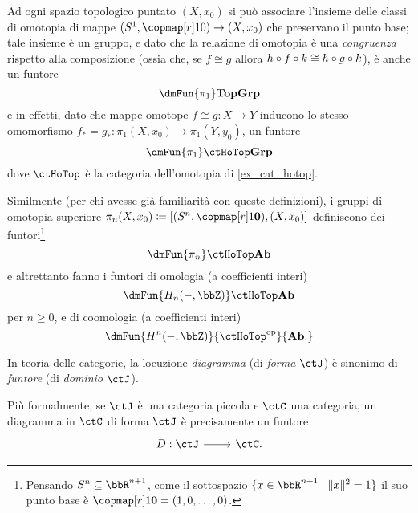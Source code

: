 \begin{example}\label{fun_ex_omoto_omolo}
	Ad ogni spazio topologico puntato $(X,x_0)$ si può associare l'insieme delle classi di omotopia di mappe $(S^1, \copmap[r] 10)\to (X, x_0)$ che preservano il punto base; tale insieme è un gruppo, e dato che la relazione di omotopia è una \emph{congruenza} rispetto alla composizione (ossia che, se $f\cong g$ allora $h\circ f\circ k\cong h\circ g\circ k$), è anche un funtore
	\[\dmFun{\pi_1}\ctTop\ctGrp\]
	e in effetti, dato che mappe omotope $f\cong g : X\to Y$ inducono lo stesso omomorfismo $f_* = g_* : \pi_1(X,x_0) \to \pi_1(Y,y_0)$, un funtore 
	\[\dmFun{\pi_1}\ctHoTop\ctGrp\]
	dove $\ctHoTop$ è la categoria dell'omotopia di \ref{ex_cat_hotop}.

	Similmente (per chi avesse già familiarità con queste definizioni), i gruppi di omotopia superiore $\pi_n(X,x_0) \defeq [(S^n,\copmap[r] 1{\mathbf{0}}), (X,x_0)]$ definiscono dei funtori\footnote{Pensando $S^n\subseteq\bbR^{n+1}$, come il sottospazio $\{x\in\bbR^{n+1}\mid \|x\|^2=1\}$ il suo punto base è $\copmap[r]1{\mathbf 0}=(1,0,\dots,0)$.} 
	\[\dmFun{\pi_n}\ctHoTop\ctAb\]
	e altrettanto fanno i funtori di omologia (a coefficienti interi)
	\[\dmFun{H_n(-,\bbZ)}\ctHoTop\ctAb\]
	per $n\ge 0$, e di coomologia (a coefficienti interi) 
	\[\dmFun{H^n(-,\bbZ)}{\ctHoTop^\op}{\ctAb.}\]
\end{example}
\begin{example}
\end{example}
\begin{example}
\end{example}
\begin{example}
\end{example}
\begin{definition}\label{def_diagramma_comm}
	In teoria delle categorie, la locuzione \emph{diagramma} (di \emph{forma} \(\ctJ\)) è sinonimo di \emph{funtore} (di \emph{dominio} \(\ctJ\)).

	Più formalmente, se \(\ctJ\) è una categoria piccola e \(\ctC\) una categoria, un diagramma in \(\ctC\) di forma \(\ctJ\) è precisamente un funtore
	\[\begin{tikzcd}
			D : \ctJ \ar[r] & \ctC.
		\end{tikzcd}
	\]
\end{definition}
